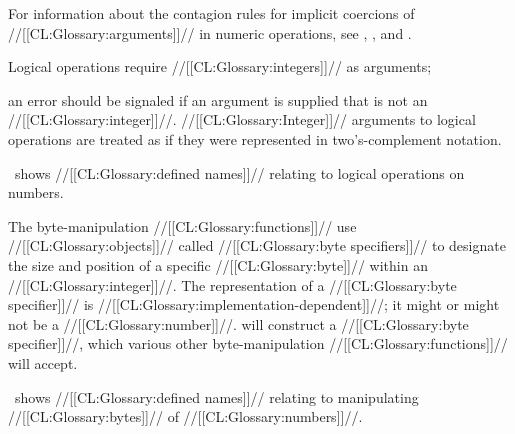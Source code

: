  

For information about the contagion rules for implicit coercions of //[[CL:Glossary:arguments]]//  in numeric operations, see
     \secref\RuleOfFloatPrecisionContagion, 
     \secref\RuleOfFloatAndRationalContagion,
 and \secref\RuleOfComplexContagion.

\endsubsubsection%



Logical operations require //[[CL:Glossary:integers]]// as arguments;

an error  should be signaled  if an argument is supplied that is not an //[[CL:Glossary:integer]]//. //[[CL:Glossary:Integer]]// arguments to logical operations are treated as if they were represented in two's-complement notation.

\Thenextfigure\ shows //[[CL:Glossary:defined names]]// relating to logical operations on numbers.

                     \endsubsubsubsection%


The byte-manipulation //[[CL:Glossary:functions]]// use //[[CL:Glossary:objects]]//  called //[[CL:Glossary:byte specifiers]]// to designate the size and position of a specific //[[CL:Glossary:byte]]// within an //[[CL:Glossary:integer]]//. The representation of a //[[CL:Glossary:byte specifier]]// is //[[CL:Glossary:implementation-dependent]]//; it might or might not be a //[[CL:Glossary:number]]//.  will construct a //[[CL:Glossary:byte specifier]]//, which various other byte-manipulation //[[CL:Glossary:functions]]// will accept.

\Thenextfigure\ shows //[[CL:Glossary:defined names]]// relating to manipulating //[[CL:Glossary:bytes]]// of //[[CL:Glossary:numbers]]//.

